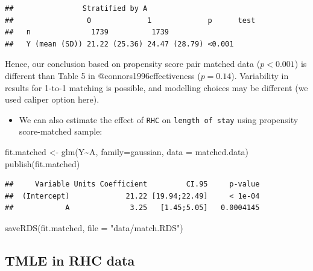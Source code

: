 \documentclass[
]{book}
\newenvironment{Shaded}{\begin{snugshade}}{\end{snugshade}}
\newcommand{\AttributeTok}[1]{\textcolor[rgb]{0.77,0.63,0.00}{#1}}
\newcommand{\FunctionTok}[1]{\textcolor[rgb]{0.00,0.00,0.00}{#1}}
\newcommand{\NormalTok}[1]{#1}
\newcommand{\OtherTok}[1]{\textcolor[rgb]{0.56,0.35,0.01}{#1}}
\newcommand{\SpecialCharTok}[1]{\textcolor[rgb]{0.00,0.00,0.00}{#1}}
\newcommand{\StringTok}[1]{\textcolor[rgb]{0.31,0.60,0.02}{#1}}
\providecommand{\tightlist}{%
  \setlength{\itemsep}{0pt}\setlength{\parskip}{0pt}}
\begin{document}
\begin{verbatim}
##                Stratified by A
##                 0             1             p      test
##   n              1739          1739                    
##   Y (mean (SD)) 21.22 (25.36) 24.47 (28.79) <0.001
\end{verbatim}

\begin{rmdcomment}
Hence, our conclusion based on propensity score pair matched data
(\(p \lt 0.001\)) is different than Table 5 in @connors1996effectiveness
(\(p = 0.14\)). Variability in results for 1-to-1 matching is possible,
and modelling choices may be different (we used caliper option here).
\end{rmdcomment}

\begin{itemize}
\tightlist
\item
  We can also estimate the effect of \texttt{RHC} on \texttt{length\ of\ stay} using propensity score-matched sample:
\end{itemize}

\begin{Shaded}
\begin{Highlighting}[]
\NormalTok{fit.matched }\OtherTok{\textless{}{-}} \FunctionTok{glm}\NormalTok{(Y}\SpecialCharTok{\textasciitilde{}}\NormalTok{A,}
            \AttributeTok{family=}\NormalTok{gaussian,  }
            \AttributeTok{data =}\NormalTok{ matched.data)  }
\FunctionTok{publish}\NormalTok{(fit.matched)}
\end{Highlighting}
\end{Shaded}

\begin{verbatim}
##     Variable Units Coefficient         CI.95     p-value 
##  (Intercept)             21.22 [19.94;22.49]     < 1e-04 
##            A              3.25   [1.45;5.05]   0.0004145
\end{verbatim}

\begin{Shaded}
\begin{Highlighting}[]
\FunctionTok{saveRDS}\NormalTok{(fit.matched, }\AttributeTok{file =} \StringTok{"data/match.RDS"}\NormalTok{)   }
\end{Highlighting}
\end{Shaded}

\hypertarget{tmle-in-rhc-data}{%
\subsection{TMLE in RHC data}\label{tmle-in-rhc-data}}
\end{document}
